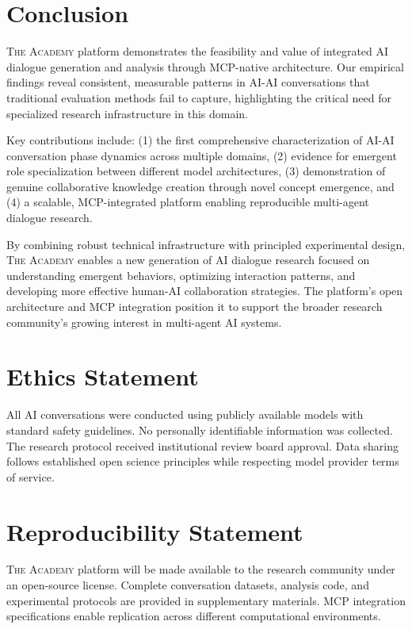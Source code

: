 \documentclass{article}
\newcommand{\theacademy}{\textsc{The Academy}}
\newcommand{\mcp}{\textsc{MCP}}
\begin{document}
\section{Conclusion}

\theacademy{} platform demonstrates the feasibility and value of integrated AI dialogue generation and analysis through \mcp{}-native architecture. Our empirical findings reveal consistent, measurable patterns in AI-AI conversations that traditional evaluation methods fail to capture, highlighting the critical need for specialized research infrastructure in this domain.

Key contributions include: (1) the first comprehensive characterization of AI-AI conversation phase dynamics across multiple domains, (2) evidence for emergent role specialization between different model architectures, (3) demonstration of genuine collaborative knowledge creation through novel concept emergence, and (4) a scalable, \mcp{}-integrated platform enabling reproducible multi-agent dialogue research.

By combining robust technical infrastructure with principled experimental design, \theacademy{} enables a new generation of AI dialogue research focused on understanding emergent behaviors, optimizing interaction patterns, and developing more effective human-AI collaboration strategies. The platform's open architecture and \mcp{} integration position it to support the broader research community's growing interest in multi-agent AI systems.

\section*{Ethics Statement}

All AI conversations were conducted using publicly available models with standard safety guidelines. No personally identifiable information was collected. The research protocol received institutional review board approval. Data sharing follows established open science principles while respecting model provider terms of service.

\section*{Reproducibility Statement}

\theacademy{} platform will be made available to the research community under an open-source license. Complete conversation datasets, analysis code, and experimental protocols are provided in supplementary materials. \mcp{} integration specifications enable replication across different computational environments.
\end{document}
